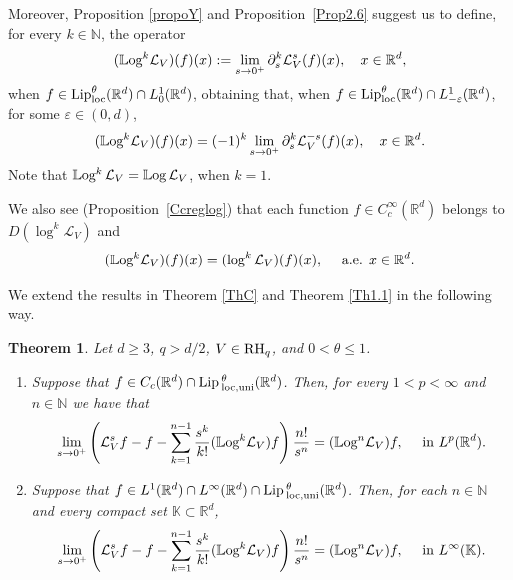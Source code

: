 \documentclass[10pt, a4paper, reqno]{amsart}
\newtheorem{thm}{Theorem}[section]
\theoremstyle{definition}
\theoremstyle{remark}
\newcommand{\RH}{\textup{RH}}
\numberwithin{equation}{section}
\begin{document}
Moreover, Proposition \ref{propoY} and Proposition~\ref{Prop2.6} suggest us to define, for every $k\in \mathbb{N}$, the operator
\begin{equation}\label{Logk}
(\mathbb{L}\textup{og}^k\mathcal L_V)(f)(x):=\lim_{s\rightarrow 0^+}\partial _s^k\mathcal L_V^s(f)(x),\quad x\in \mathbb R^d,
\end{equation}
when $f\in {\textup{Lip}}^\theta _{\rm loc}(\mathbb R^d)\cap L^1_0(\mathbb R^d)$, obtaining that, when $f\in {\textup{Lip}}_{\rm loc}^\theta (\mathbb R^d)\cap L^1_{-\varepsilon}(\mathbb R^d)$, for some $\varepsilon \in (0,d)$, 
\[
(\mathbb{L}\textup{og}^k\mathcal L_V)(f)(x)=(-1)^k\lim_{s\rightarrow 0^+}\partial _s^k\mathcal L_V^{-s}(f)(x),\quad x\in \mathbb R^d.
\]
Note that $\mathbb{L}\textup{og}^k\,\mathcal{L}_V=\mathbb{L}\textup{og}\,\mathcal{L}_V$, when $k=1$.


We also see (Proposition~\ref{Ccreglog}) that each function $f\in C_c^\infty (\mathbb R^d)$ belongs to $D(\log ^k\mathcal L_V)$ and
\[
(\mathbb{L}\textup{og}^k\mathcal L_V)(f)(x)=(\log ^k\mathcal L_V)(f)(x),\quad \text{ a.e. }x\in \mathbb R^d.
\]



We extend the results in Theorem \ref{ThC} and Theorem \ref{Th1.1} in the following way. 

\begin{thm}\label{Th1.2}
Let $d\geq 3$, $q>d/2$, $V\in \RH_q$, and $0<\theta \leq 1$. 
\begin{enumerate}[label=\textnormal{(\alph*)}]
    \item \label{itm: Th1.2-a} Suppose that $f\in C_c(\mathbb R^d)\cap {\textup{Lip}}\,^\theta _{\textup{loc},\textup{uni}}(\mathbb R^d)$. Then, for every $1<p<\infty$ and $n\in \mathbb N$ we have that
\begin{equation}\label{1.10}
\lim_{s\rightarrow 0^+}\left(\mathcal L_V^sf-f-\sum_{k=1}^{n-1}\frac{s^k}{k!}(\mathbb{L}\textup{og}^k\mathcal L_V)f\right)\frac{n!}{s^n}=(\mathbb{L}\textup{og}^n\mathcal L_V)f,\quad \mbox{ in }L^p(\mathbb R^d).
\end{equation}
\item \label{itm: Th1.2-b} Suppose that $f\in L^1(\mathbb R^d)\cap L^\infty (\mathbb R^d)\cap {\textup{Lip}}\,^\theta _{\textup{loc},\textup{uni}}(\mathbb R^d)$. Then, for each $n\in \mathbb N$ and every compact set $\mathbb K\subset \mathbb R^d$, 
\begin{equation}\label{1.11}
\lim_{s\rightarrow 0^+}\left(\mathcal L_V^sf-f-\sum_{k=1}^{n-1}\frac{s^k}{k!}(\mathbb{L}\textup{og}^k\mathcal L_V)f\right)\frac{n!}{s^n}=(\mathbb{L}\textup{og}^n\mathcal L_V)f,\quad \mbox{ in }L^\infty(\mathbb K).
\end{equation}
\end{enumerate}
\end{thm}
\end{document}
